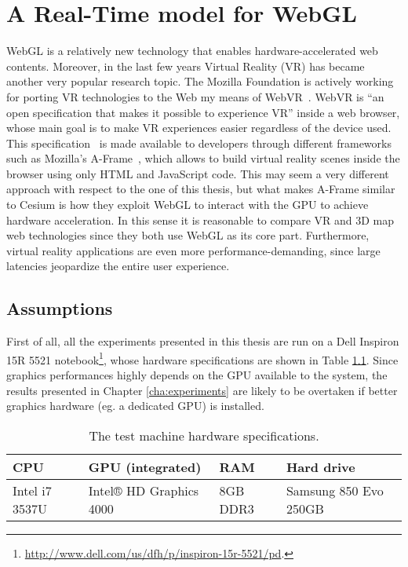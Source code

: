 \chapter{A Real-Time model for WebGL} \label{cha:rt_model}

WebGL is a relatively new technology that enables hardware-accelerated web
contents. Moreover, in the last few years Virtual Reality (VR) has became
another very popular research topic. The Mozilla Foundation is actively working
for porting VR technologies to the Web my means of WebVR~\cite{mozvr}. WebVR is
``an open specification that makes it possible to experience VR'' inside a web
browser, whose main goal is to make VR experiences easier regardless of the
device used. This specification~\cite{webvrspecs} is made available to developers
through different frameworks such as Mozilla's A-Frame~\cite{aframe}, which allows
to build virtual reality scenes inside the browser using only HTML and JavaScript
code. This may seem a very different approach with respect to the one of this
thesis, but what makes A-Frame similar to Cesium is how they exploit WebGL to
interact with the GPU to achieve hardware acceleration. In this sense it is
reasonable to compare VR and 3D map web technologies since they both use WebGL
as its core part. Furthermore, virtual reality applications are even more
performance-demanding, since large latencies jeopardize the entire user
experience.


\section{Assumptions}
First of all, all the experiments presented in this thesis are run on a Dell
Inspiron 15R 5521 notebook\footnote{\url{http://www.dell.com/us/dfh/p/inspiron-15r-5521/pd}.},
whose hardware specifications are shown in Table \ref{tab:notebook_specs}.
Since graphics performances highly depends on the GPU available to the system,
the results presented in Chapter \ref{cha:experiments} are likely to be overtaken
if better graphics hardware (eg. a dedicated GPU) is installed.
\begin{table}[!htb]
    \centering
    \caption{The test machine hardware specifications.}
    \label{tab:notebook_specs}
    \begin{tabular}{|l|l|l|l|}
    \hline
    \multicolumn{1}{|l|}{\textbf{CPU}} & \multicolumn{1}{l|}{\textbf{GPU (integrated)}} & \multicolumn{1}{l|}{\textbf{RAM}} & \multicolumn{1}{l|}{\textbf{Hard drive}} \\ \hline
    Intel i7 3537U & Intel® HD Graphics 4000 & 8GB DDR3 & Samsung 850 Evo 250GB \\ \hline
    \end{tabular}
\end{table}

